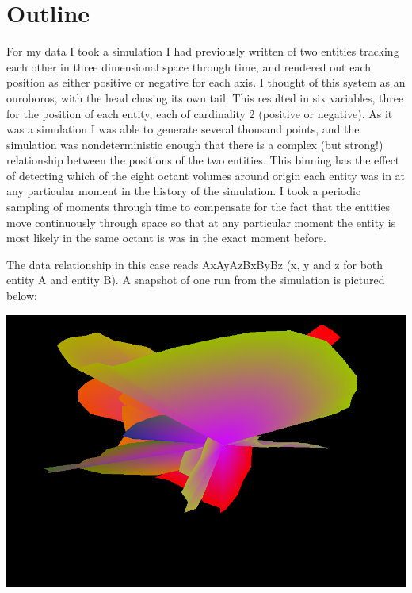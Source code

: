 \documentclass[11pt]{article}
\begin{document}
\maketitle

\section{Outline}

For my data I took a simulation I had previously written of two entities tracking each other in three dimensional space through time, and rendered out each position as either positive or negative for each axis.  I thought of this system as an ouroboros, with the head chasing its own tail.  This resulted in six variables, three for the position of each entity, each of cardinality 2 (positive or negative).  As it was a simulation I was able to generate several thousand points, and the simulation was nondeterministic enough that there is a complex (but strong!) relationship between the positions of the two entities.  This binning has the effect of detecting which of the eight octant volumes around origin each entity was in at any particular moment in the history of the simulation.  I took a periodic sampling of moments through time to compensate for the fact that the entities move continuously through space so that at any particular moment the entity is most likely in the same octant is was in the exact moment before.  

The data relationship in this case reads AxAyAzBxByBz (x, y and z for both entity A and entity B).  A snapshot of one run from the simulation is pictured below:

\begin{center}
\includegraphics[scale=0.4]{ouroboros.png}
\end{center}
\end{document}
